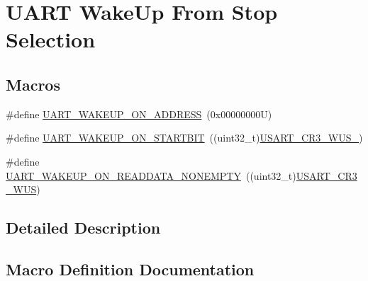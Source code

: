 \hypertarget{group___u_a_r_t___wake_up__from___stop___selection}{}\section{U\+A\+RT Wake\+Up From Stop Selection}
\label{group___u_a_r_t___wake_up__from___stop___selection}
\subsection*{Macros}
\begin{DoxyCompactItemize}
\item 
\#define \hyperlink{group___u_a_r_t___wake_up__from___stop___selection_ga926f94a665ed3d200e76aeb01f2ae275}{U\+A\+R\+T\+\_\+\+W\+A\+K\+E\+U\+P\+\_\+\+O\+N\+\_\+\+A\+D\+D\+R\+E\+SS}~(0x00000000\+U)
\item 
\#define \hyperlink{group___u_a_r_t___wake_up__from___stop___selection_gade5095181db7434078e904af198c1699}{U\+A\+R\+T\+\_\+\+W\+A\+K\+E\+U\+P\+\_\+\+O\+N\+\_\+\+S\+T\+A\+R\+T\+B\+IT}~((uint32\+\_\+t)\hyperlink{group___peripheral___registers___bits___definition_ga3187bcba3c2e213f8a0523aa02837b32}{U\+S\+A\+R\+T\+\_\+\+C\+R3\+\_\+\+W\+U\+S\+\_})
\item 
\#define \hyperlink{group___u_a_r_t___wake_up__from___stop___selection_ga77464f7eaba9f0a34876b1df36b8292e}{U\+A\+R\+T\+\_\+\+W\+A\+K\+E\+U\+P\+\_\+\+O\+N\+\_\+\+R\+E\+A\+D\+D\+A\+T\+A\+\_\+\+N\+O\+N\+E\+M\+P\+TY}~((uint32\+\_\+t)\hyperlink{group___peripheral___registers___bits___definition_ga76d102b464f15cbe18b0d83b61150293}{U\+S\+A\+R\+T\+\_\+\+C\+R3\+\_\+\+W\+US})
\end{DoxyCompactItemize}


\subsection{Detailed Description}


\subsection{Macro Definition Documentation}
\mbox{\label{group___u_a_r_t___wake_up__from___stop___selection_ga926f94a665ed3d200e76aeb01f2ae275}} 
